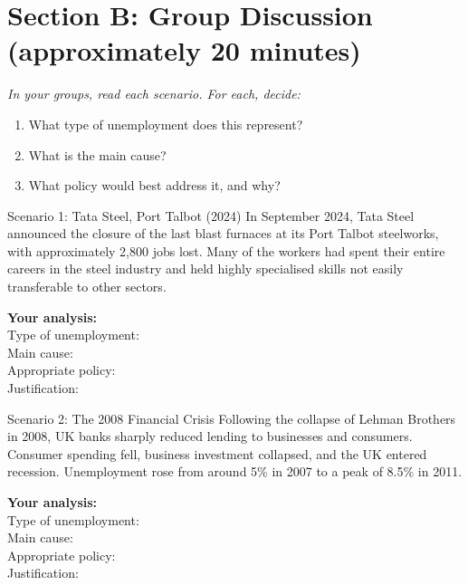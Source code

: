\documentclass[12pt,a4paper]{article}
\begin{document}
\newpage

\section*{Section B: Group Discussion (approximately 20 minutes)}

\textit{In your groups, read each scenario. For each, decide:}
\begin{enumerate}[label=(\alph*), topsep=2pt]
    \item What type of unemployment does this represent?
    \item What is the main cause?
    \item What policy would best address it, and why?
\end{enumerate}

\vspace{0.8em}

\begin{scenario}{Scenario 1: Tata Steel, Port Talbot (2024)}
    In September 2024, Tata Steel announced the closure of the last blast furnaces at its Port Talbot steelworks, with approximately 2,800 jobs lost. Many of the workers had spent their entire careers in the steel industry and held highly specialised skills not easily transferable to other sectors.
\end{scenario}

\vspace{0.5em}
\textbf{Your analysis:}\\
Type of unemployment: \dotfill \\[0.4em]
Main cause: \dotfill \\[0.4em]
Appropriate policy: \dotfill \\[0.4em]
Justification: \dotfill

\vspace{1em}

\begin{scenario}{Scenario 2: The 2008 Financial Crisis}
    Following the collapse of Lehman Brothers in 2008, UK banks sharply reduced lending to businesses and consumers. Consumer spending fell, business investment collapsed, and the UK entered recession. Unemployment rose from around 5\% in 2007 to a peak of 8.5\% in 2011.
\end{scenario}

\vspace{0.5em}
\textbf{Your analysis:}\\
Type of unemployment: \dotfill \\[0.4em]
Main cause: \dotfill \\[0.4em]
Appropriate policy: \dotfill \\[0.4em]
Justification: \dotfill
\end{document}
